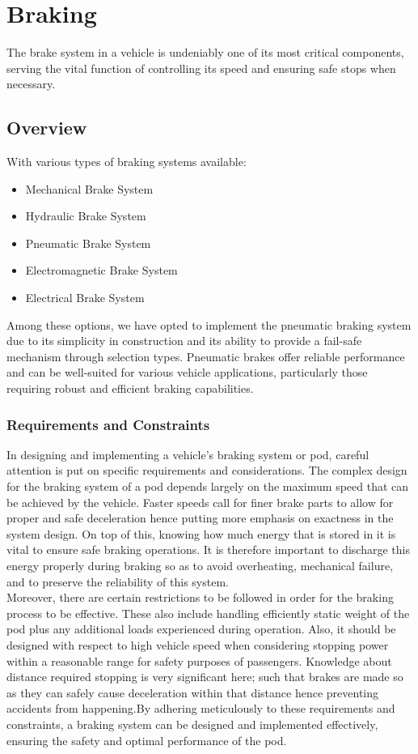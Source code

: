 \section{Braking}
The brake system in a vehicle is undeniably one of its most critical components, serving the vital function of controlling its speed and ensuring safe stops when necessary.


\subsection{Overview}
With various types of braking systems available:

\begin{itemize}
    \item Mechanical Brake System
    \item Hydraulic Brake System
    \item Pneumatic Brake System
    \item Electromagnetic Brake System
    \item Electrical Brake System
    
\end{itemize}

Among these options, we have opted to implement the pneumatic braking system due to its simplicity in construction and its ability to provide a fail-safe mechanism through selection types. Pneumatic brakes offer reliable performance and can be well-suited for various vehicle applications, particularly those requiring robust and efficient braking capabilities.
\subsubsection{Requirements and Constraints}
In designing and implementing a vehicle's braking system or pod, careful attention is put on specific requirements and considerations. The complex design for the braking system of a pod depends largely on the maximum speed that can be achieved by the vehicle. Faster speeds call for finer brake parts to allow for proper and safe deceleration hence putting more emphasis on exactness in the system design. On top of this, knowing how much energy that is stored in it is vital to ensure safe braking operations. It is therefore important to discharge this energy properly during braking so as to avoid overheating, mechanical failure, and to preserve the reliability of this system.\\


Moreover, there are certain restrictions to be followed in order for the braking process to be effective. These also include handling efficiently static weight of the pod plus any additional loads experienced during operation. Also, it should be designed with respect to high vehicle speed when considering stopping power within a reasonable range for safety purposes of passengers. Knowledge about distance required stopping is very significant here; such that brakes are made so as they can safely cause deceleration within that distance hence preventing accidents from happening.By adhering meticulously to these requirements and constraints, a braking system can be designed and implemented effectively, ensuring the safety and optimal performance of the pod.

